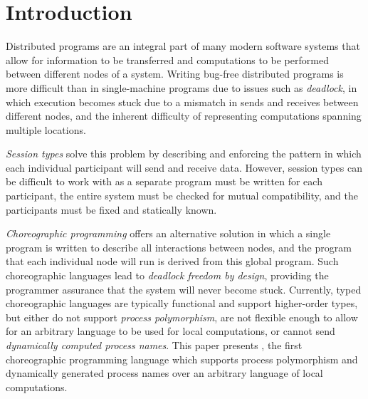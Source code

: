 \section{Introduction}
\label{sec:introduction}

Distributed programs are an integral part of many modern software systems that allow for information to be transferred and computations to be performed between different nodes of a system.
Writing bug-free distributed programs is more difficult than in single-machine programs due to issues such as \emph{deadlock}, in which execution becomes stuck due to a mismatch in sends and receives between different nodes, and the inherent difficulty of representing computations spanning multiple locations.

\emph{Session types} solve this problem by describing and enforcing the pattern in which each individual participant will send and receive data.
However, session types can be difficult to work with as a separate program must be written for each participant, the entire system must be checked for mutual compatibility, and the participants must be fixed and statically known.

\emph{Choreographic programming} offers an alternative solution in which a single program is written to describe all interactions between nodes, and the program that each individual node will run is derived from this global program.
Such choreographic languages lead to \emph{deadlock freedom by design}, providing the programmer assurance that the system will never become stuck.
Currently, typed choreographic languages are typically functional and support higher-order types, but either do not support \emph{process polymorphism}, are not flexible enough to allow for an arbitrary language to be used for local computations, or cannot send \emph{dynamically computed process names}.
This paper presents \langname, the first choreographic programming language which supports process polymorphism and dynamically generated process names over an arbitrary language of local computations.

